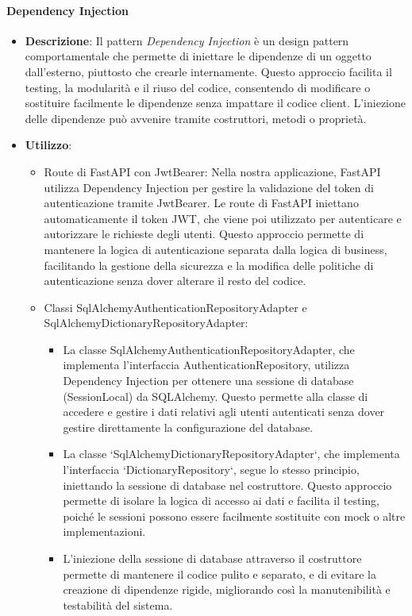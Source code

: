 \paragraph{Dependency Injection}
\begin{itemize}
    \item \textbf{Descrizione}: Il pattern \textit{Dependency Injection} è un design pattern comportamentale che permette di iniettare le dipendenze di un oggetto dall'esterno, piuttosto che crearle internamente. Questo approccio facilita il testing, la modularità e il riuso del codice, consentendo di modificare o sostituire facilmente le dipendenze senza impattare il codice client. L'iniezione delle dipendenze può avvenire tramite costruttori, metodi o proprietà.
    \item \textbf{Utilizzo}:
    \begin{itemize}
        \item Route di FastAPI con JwtBearer: Nella nostra applicazione, FastAPI utilizza Dependency Injection per gestire la validazione del token di autenticazione tramite JwtBearer. Le route di FastAPI iniettano automaticamente il token JWT, che viene poi utilizzato per autenticare e autorizzare le richieste degli utenti. Questo approccio permette di mantenere la logica di autenticazione separata dalla logica di business, facilitando la gestione della sicurezza e la modifica delle politiche di autenticazione senza dover alterare il resto del codice.
        \item Classi SqlAlchemyAuthenticationRepositoryAdapter e SqlAlchemyDictionaryRepositoryAdapter:
        \begin{itemize}
            \item La classe SqlAlchemyAuthenticationRepositoryAdapter, che implementa l'interfaccia AuthenticationRepository, utilizza Dependency Injection per ottenere una sessione di database (SessionLocal) da SQLAlchemy. Questo permette alla classe di accedere e gestire i dati relativi agli utenti autenticati senza dover gestire direttamente la configurazione del database.
            \item La classe `SqlAlchemyDictionaryRepositoryAdapter`, che implementa l'interfaccia `DictionaryRepository`, segue lo stesso principio, iniettando la sessione di database nel costruttore. Questo approccio permette di isolare la logica di accesso ai dati e facilita il testing, poiché le sessioni possono essere facilmente sostituite con mock o altre implementazioni.
            \item L'iniezione della sessione di database attraverso il costruttore permette di mantenere il codice pulito e separato, e di evitare la creazione di dipendenze rigide, migliorando così la manutenibilità e testabilità del sistema.
        \end{itemize}
    \end{itemize}
\end{itemize}


